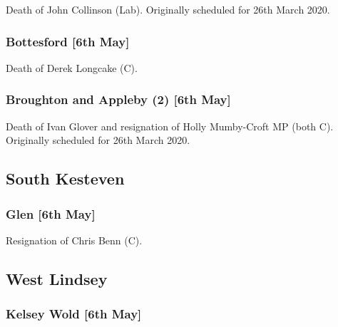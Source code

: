 \documentclass[a4paper,openany]{book}
\begin{document}
\begin{resultsiii}

Death of John Collinson (Lab).  Originally scheduled for 26th March 2020.

\subsubsection*{Bottesford \hspace*{\fill}\nolinebreak[1]%
	\enspace\hspace*{\fill}
	[6th May]}


Death of Derek Longcake (C).

\subsubsection*{Broughton and Appleby (2) \hspace*{\fill}\nolinebreak[1]%
	\enspace\hspace*{\fill}
	[6th May]}


Death of Ivan Glover and resignation of Holly Mumby-Croft MP (both C).  Originally scheduled for 26th March 2020.

\subsection*{South Kesteven}

\subsubsection*{Glen \hspace*{\fill}\nolinebreak[1]%
	\enspace\hspace*{\fill}
	[6th May]}


Resignation of Chris Benn (C).

\subsection*{West Lindsey}

\subsubsection*{Kelsey Wold \hspace*{\fill}\nolinebreak[1]%
	\enspace\hspace*{\fill}
	[6th May]}


\end{resultsiii}
\end{document}
